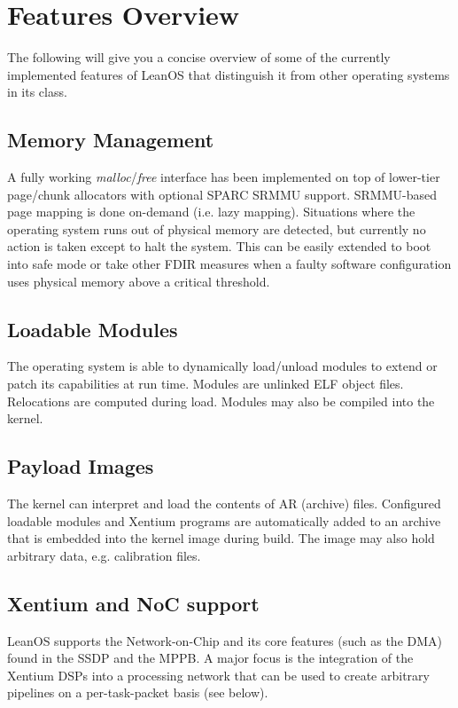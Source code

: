 \section {Features Overview}

The following will give you a concise overview of some of the currently 
implemented features of LeanOS that distinguish it from other operating
systems in its class.

\subsection {Memory Management}

A fully working \emph{malloc}/\emph{free} interface has been implemented on top
of lower-tier page/chunk allocators with optional SPARC SRMMU support.
SRMMU-based page mapping is done on-demand (i.e. lazy mapping). Situations
where the operating system runs out of physical memory are detected, but
currently no action is taken except to halt the system. This can be easily
extended to boot into safe mode or take other FDIR measures when a faulty
software configuration uses physical memory above a critical threshold.

\subsection {Loadable Modules}

The operating system is able to dynamically load/unload modules to extend
or patch its capabilities at run time. Modules are unlinked ELF object files.
Relocations are computed during load. Modules may also be compiled into the
kernel.

\subsection {Payload Images}

The kernel can interpret and load the contents of AR (archive) files. Configured
loadable modules and Xentium programs are automatically added to an archive
that is embedded into the kernel image during build. The image may also hold
arbitrary data, e.g. calibration files.


\subsection {Xentium and NoC support}

LeanOS supports the Network-on-Chip and its core features (such as the DMA)
found in the \gls{SSDP} and the \gls{MPPB}. A major focus is the integration
of the \gls{Xentium} \glspl{DSP} into a processing network that can be used to
create arbitrary pipelines on a per-task-packet basis (see below).

